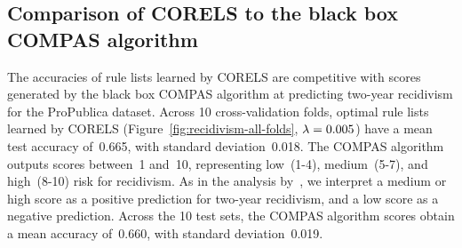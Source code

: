 \subsection{Comparison of CORELS to the black box COMPAS algorithm}
\label{sec:compas}

The accuracies of rule lists learned by CORELS are competitive with
scores generated by the black box COMPAS algorithm
at predicting two-year recidivism for the ProPublica dataset.
%
Across 10 cross-validation folds, optimal rule lists learned by CORELS
(Figure~\ref{fig:recidivism-all-folds}, ${{\lambda} = 0.005}$)
have a mean test accuracy of~0.665, with standard deviation~0.018.
%
The COMPAS algorithm outputs scores between~1 and~10,
representing low~(1-4), medium~(5-7), and high~(8-10) risk for recidivism.
%
As in the analysis by~\citep{LarsonMaKiAn16}, we interpret a medium or high score
as a positive prediction for two-year recidivism, and a low score as a negative prediction.
%
Across the 10 test sets, the COMPAS algorithm scores obtain
a mean accuracy of~0.660, with standard deviation~0.019.

%
%
%
%

